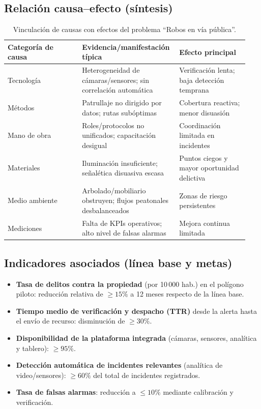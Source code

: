 \documentclass[12pt,a4paper]{article}
\begin{document}
\subsection*{Relación causa–efecto (síntesis)}
\begin{table}[htbp]
\centering
\caption{Vinculación de causas con efectos del problema “Robos en vía pública”.}
\begin{tabular}{p{0.30\linewidth} p{0.36\linewidth} p{0.28\linewidth}}
\hline
\textbf{Categoría de causa} & \textbf{Evidencia/manifestación típica} & \textbf{Efecto principal} \\
\hline
Tecnología & Heterogeneidad de cámaras/sensores; sin correlación automática & Verificación lenta; baja detección temprana \\
Métodos & Patrullaje no dirigido por datos; rutas subóptimas & Cobertura reactiva; menor disuasión \\
Mano de obra & Roles/protocolos no unificados; capacitación desigual & Coordinación limitada en incidentes \\
Materiales & Iluminación insuficiente; señalética disuasiva escasa & Puntos ciegos y mayor oportunidad delictiva \\
Medio ambiente & Arbolado/mobiliario obstruyen; flujos peatonales desbalanceados & Zonas de riesgo persistentes \\
Mediciones & Falta de KPIs operativos; alto nivel de falsas alarmas & Mejora continua limitada \\
\hline
\end{tabular}
\end{table}

\subsection*{Indicadores asociados (línea base y metas)}
\begin{itemize}
    \item \textbf{Tasa de delitos contra la propiedad} (por 10\,000 hab.) en el polígono piloto: reducción relativa de \(\geq 15\%\) a 12 meses respecto de la línea base.
    \item \textbf{Tiempo medio de verificación y despacho (TTR)} desde la alerta hasta el envío de recurso: disminución de \(\geq 30\%\).
    \item \textbf{Disponibilidad de la plataforma integrada} (cámaras, sensores, analítica y tablero): \(\geq 95\%\).
    \item \textbf{Detección automática de incidentes relevantes} (analítica de video/sensores): \(\geq 60\%\) del total de incidentes registrados.
    \item \textbf{Tasa de falsas alarmas}: reducción a \(\leq 10\%\) mediante calibración y verificación.
\end{itemize}
\end{document}

